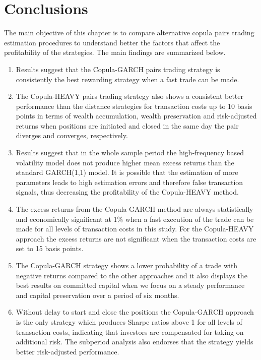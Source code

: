 \documentclass[a4paper,12pt]{report}
\begin{document}
\vspace{0.6cm}

\section{Conclusions}

The main objective of this chapter is to compare alternative copula pairs trading estimation procedures to understand better the factors that affect the profitability of the strategies. The main findings are summarized below.

\begin{enumerate}
	\item Results suggest that the Copula-GARCH pairs trading strategy is consistently the best rewarding strategy when a fast trade can be made.
	\item The Copula-HEAVY pairs trading strategy also shows a consistent better performance than the distance strategies for transaction costs up to 10 basis points in terms of wealth accumulation, wealth preservation and risk-adjusted returns when positions are initiated and closed in the same day the pair diverges and converges, respectively. 
	\item Results suggest that in the whole sample period the high-frequency based volatility model does not produce higher mean excess returns than the standard GARCH(1,1) model. It is possible that the estimation of more parameters leads to high estimation errors and therefore false transaction signals, thus decreasing the profitability of the Copula-HEAVY method.
	\item The excess returns from the Copula-GARCH method are always statistically and economically significant at 1\% when a fast execution of the trade can be made for all levels of transaction costs in this study. For the Copula-HEAVY approach the excess returns are not significant when the transaction costs are set to 15 basis points. 
	\item The Copula-GARCH strategy shows a lower probability of a trade with negative returns compared to the other approaches and it also displays the best results on committed capital when we focus on a steady performance and capital preservation over a period of six months.
	\item Without delay to start and close the positions the Copula-GARCH approach is the only strategy which produces Sharpe ratios above 1 for all levels of transaction costs, indicating that investors are compensated for taking on additional risk. The subperiod analysis also endorses that the strategy yields better risk-adjusted performance.

\end{enumerate}
\end{document}
